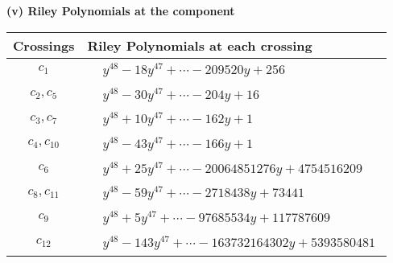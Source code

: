 \documentclass[1p]{elsarticle_modified}
\theoremstyle{definition}
\begin{document}
\newpage\renewcommand{\arraystretch}{1}
\flushleft \textbf{(v) Riley Polynomials at the component}\newline \\
\begin{tabular}{m{50pt}|m{274pt}}
Crossings & \hspace{64pt}Riley Polynomials at each crossing \\
\hline $$\begin{aligned}c_{1}\end{aligned}$$&$\begin{aligned}
&y^{48}-18 y^{47}+\cdots-209520 y+256
\end{aligned}$\\
\hline $$\begin{aligned}c_{2},c_{5}\end{aligned}$$&$\begin{aligned}
&y^{48}-30 y^{47}+\cdots-204 y+16
\end{aligned}$\\
\hline $$\begin{aligned}c_{3},c_{7}\end{aligned}$$&$\begin{aligned}
&y^{48}+10 y^{47}+\cdots-162 y+1
\end{aligned}$\\
\hline $$\begin{aligned}c_{4},c_{10}\end{aligned}$$&$\begin{aligned}
&y^{48}-43 y^{47}+\cdots-166 y+1
\end{aligned}$\\
\hline $$\begin{aligned}c_{6}\end{aligned}$$&$\begin{aligned}
&y^{48}+25 y^{47}+\cdots-20064851276 y+4754516209
\end{aligned}$\\
\hline $$\begin{aligned}c_{8},c_{11}\end{aligned}$$&$\begin{aligned}
&y^{48}-59 y^{47}+\cdots-2718438 y+73441
\end{aligned}$\\
\hline $$\begin{aligned}c_{9}\end{aligned}$$&$\begin{aligned}
&y^{48}+5 y^{47}+\cdots-97685534 y+117787609
\end{aligned}$\\
\hline $$\begin{aligned}c_{12}\end{aligned}$$&$\begin{aligned}
&y^{48}-143 y^{47}+\cdots-163732164302 y+5393580481
\end{aligned}$\\
\hline
\end{tabular}\\~\\
\end{document}
